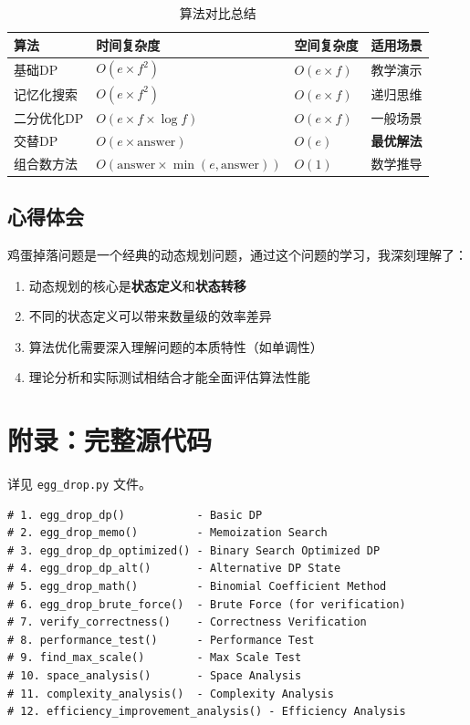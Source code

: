 \documentclass[12pt,a4paper]{article}
\begin{document}
\begin{table}[H]
\centering
\caption{算法对比总结}
\label{tab:summary}
\begin{tabular}{@{}llll@{}}
\toprule
\textbf{算法} & \textbf{时间复杂度} & \textbf{空间复杂度} & \textbf{适用场景} \\
\midrule
基础DP & $O(e \times f^2)$ & $O(e \times f)$ & 教学演示 \\
记忆化搜索 & $O(e \times f^2)$ & $O(e \times f)$ & 递归思维 \\
二分优化DP & $O(e \times f \times \log f)$ & $O(e \times f)$ & 一般场景 \\
交替DP & $O(e \times \text{answer})$ & $O(e)$ & \textbf{最优解法} \\
组合数方法 & $O(\text{answer} \times \min(e,\text{answer}))$ & $O(1)$ & 数学推导 \\
\bottomrule
\end{tabular}
\end{table}

\subsection{心得体会}

鸡蛋掉落问题是一个经典的动态规划问题，通过这个问题的学习，我深刻理解了：

\begin{enumerate}
    \item 动态规划的核心是\textbf{状态定义}和\textbf{状态转移}
    \item 不同的状态定义可以带来数量级的效率差异
    \item 算法优化需要深入理解问题的本质特性（如单调性）
    \item 理论分析和实际测试相结合才能全面评估算法性能
\end{enumerate}

\section{附录：完整源代码}

详见 \texttt{egg\_drop.py} 文件。

\begin{lstlisting}[caption=Main Function List]
# 1. egg_drop_dp()           - Basic DP
# 2. egg_drop_memo()         - Memoization Search
# 3. egg_drop_dp_optimized() - Binary Search Optimized DP
# 4. egg_drop_dp_alt()       - Alternative DP State
# 5. egg_drop_math()         - Binomial Coefficient Method
# 6. egg_drop_brute_force()  - Brute Force (for verification)
# 7. verify_correctness()    - Correctness Verification
# 8. performance_test()      - Performance Test
# 9. find_max_scale()        - Max Scale Test
# 10. space_analysis()       - Space Analysis
# 11. complexity_analysis()  - Complexity Analysis
# 12. efficiency_improvement_analysis() - Efficiency Analysis
\end{lstlisting}
\end{document}
